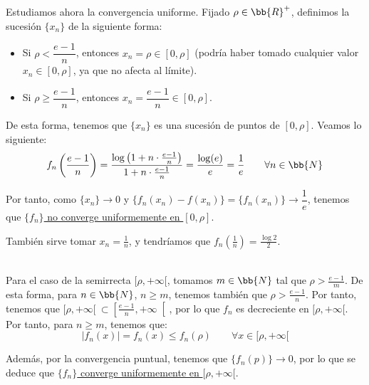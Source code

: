 \begin{ejercicio}
    Estudiamos ahora la convergencia uniforme. Fijado $\rho \in \bb{R}^+$, definimos la sucesión $\{x_n\}$ de la siguiente forma:
    \begin{itemize}
        \item Si $\rho < \dfrac{e-1}{n}$, entonces $x_n = \rho \in [0,\rho]$ (podría haber tomado cualquier valor $x_n\in [0,\rho]$, ya que no afecta al límite).
        \item Si $\rho \geq \dfrac{e-1}{n}$, entonces $x_n = \dfrac{e-1}{n}\in [0, \rho]$.
    \end{itemize}

    De esta forma, tenemos que $\{x_n\}$ es una sucesión de puntos de $[0,\rho]$. Veamos lo siguiente:
    \begin{equation*}
        f_n\left(\frac{e-1}{n}\right) = \frac{\log\left(1+n\cdot \frac{e-1}{n}\right)}{1+n\cdot \frac{e-1}{n}} =
        \frac{\log(e)}{e} = \frac{1}{e} \qquad \forall n\in \bb{N}
    \end{equation*}

    Por tanto, como $\{x_n\}\to 0$ y $\{f_n(x_n)-f(x_n)\}=\{f_n(x_n)\}\to \dfrac{1}{e}$, tenemos que \ul{$\{f_n\}$ no converge uniformemente en $[0,\rho]$}.
    \begin{observacion}
        También sirve tomar $x_n = \frac{1}{n}$, y tendríamos que $f_n\left(\frac{1}{n}\right) = \frac{\log 2}{2}$.
    \end{observacion}~\\

    Para el caso de la semirrecta $[\rho,+\infty[$, tomamos $m\in \bb{N}$ tal que $\rho > \frac{e-1}{m}$. De esta forma,
    para $n\in \bb{N}$, $n\geq m$, tenemos también que $\rho > \frac{e-1}{n}$. Por tanto,
    tenemos que $[\rho ,+\infty[~\subset \left[\frac{e-1}{n},+\infty\right[$,
    por lo que $f_n$ es decreciente en $[\rho,+\infty[$. Por tanto, para $n\geq m$, tenemos que:
    \begin{equation*}
        |f_n(x)| = f_n(x) \leq f_n(\rho) \qquad \forall x\in [\rho,+\infty[
    \end{equation*}

    Además, por la convergencia puntual, tenemos que $\{f_n(p)\}\to 0$, por lo que se deduce que \ul{$\{f_n\}$ converge uniformemente en $[\rho,+\infty[$}.
\end{ejercicio}



